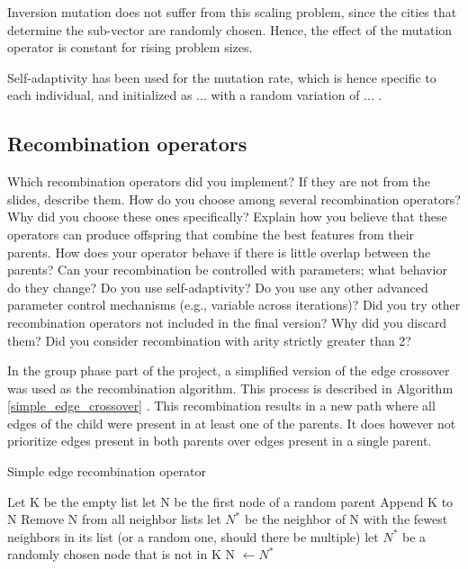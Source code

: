 \documentclass[a4paper,10pt]{article}
\newcommand{\ReplaceMe}[1]{{\color{blue}#1}}
\begin{document}
Inversion mutation does not suffer from this scaling problem, since the cities that determine the sub-vector are randomly chosen. Hence, the effect of the mutation operator is constant for rising problem sizes.  

Self-adaptivity has been used for the mutation rate, which is hence specific to each individual, and initialized as ... %
with a random variation of ... %
.

\subsection{Recombination operators}
\label{recombination}
\ReplaceMe{Which recombination operators did you implement? If they are not from the slides, describe them. How do you choose among several recombination operators? Why did you choose these ones specifically? Explain how you believe that these operators can produce offspring that combine the best features from their parents. How does your operator behave if there is little overlap between the parents? Can your recombination be controlled with parameters; what behavior do they change? Do you use self-adaptivity? Do you use any other advanced parameter control mechanisms (e.g., variable across iterations)? Did you try other recombination operators not included in the final version? Why did you discard them? Did you consider recombination with arity strictly greater than 2?}

In the group phase part of the project, a simplified version of the edge crossover was used as the recombination algorithm. This process is described in Algorithm \ref{simple_edge_crossover} \cite{initial_implementation_edge_crossover}. This recombination results in a new path where all edges of the child were present in at least one of the parents. It does however not prioritize edges present in both parents over edges present in a single parent.

\begin{algorithm}
\caption{Simple edge recombination operator}\label{simple_edge_crossover}
\begin{algorithmic}
\State Let K be the empty list
\State let N be the first node of a random parent
\State Append K to N
\State Remove N from all neighbor lists
\State let $N^*$ be the neighbor of N with the fewest neighbors in its list (or a random one, should there be multiple)
\Else 
\State let $N^*$ be a randomly chosen node that is not in K
\EndIf
\EndWhile
\State N $\gets N^*$
\end{algorithmic}
\end{algorithm}
\end{document}
